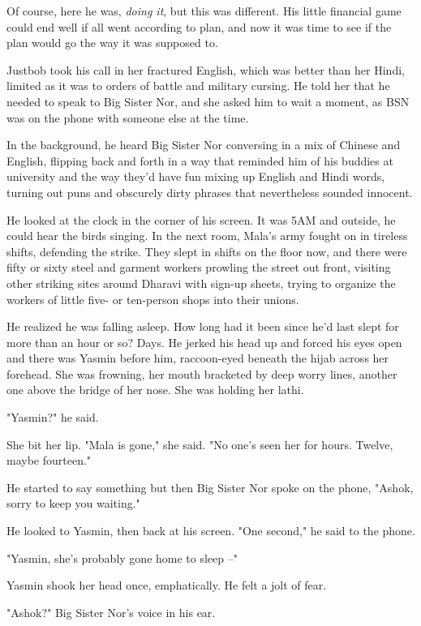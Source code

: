 Of course, here he was, \emph{doing it}, but this was different.
His little financial game could end well if all went according to
plan, and now it was time to see if the plan would go the way it
was supposed to.

Justbob took his call in her fractured English, which was better
than her Hindi, limited as it was to orders of battle and military
cursing. He told her that he needed to speak to Big Sister Nor, and
she asked him to wait a moment, as BSN was on the phone with
someone else at the time.

In the background, he heard Big Sister Nor conversing in a mix of
Chinese and English, flipping back and forth in a way that reminded
him of his buddies at university and the way they'd have fun mixing
up English and Hindi words, turning out puns and obscurely dirty
phrases that nevertheless sounded innocent.

He looked at the clock in the corner of his screen. It was 5AM and
outside, he could hear the birds singing. In the next room, Mala's
army fought on in tireless shifts, defending the strike. They slept
in shifts on the floor now, and there were fifty or sixty steel and
garment workers prowling the street out front, visiting other
striking sites around Dharavi with sign-up sheets, trying to
organize the workers of little five- or ten-person shops into their
unions.

He realized he was falling asleep. How long had it been since he'd
last slept for more than an hour or so? Days. He jerked his head up
and forced his eyes open and there was Yasmin before him,
raccoon-eyed beneath the hijab across her forehead. She was
frowning, her mouth bracketed by deep worry lines, another one
above the bridge of her nose. She was holding her lathi.

"Yasmin?" he said.

She bit her lip. "Mala is gone," she said. "No one's seen her for
hours. Twelve, maybe fourteen."

He started to say something but then Big Sister Nor spoke on the
phone, "Ashok, sorry to keep you waiting."

He looked to Yasmin, then back at his screen. "One second," he said
to the phone.

"Yasmin, she's probably gone home to sleep --"

Yasmin shook her head once, emphatically. He felt a jolt of fear.

"Ashok?" Big Sister Nor's voice in his ear.

